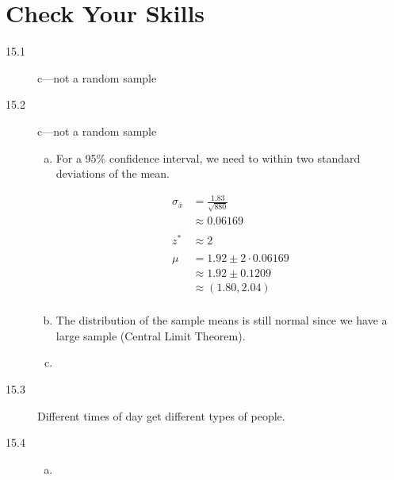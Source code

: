 \documentclass[letterpaper, landscape]{exam}
\begin{document}
  \section{Check Your Skills}
  \begin{description}
    \item[15.1] c---not a random sample

    \item[15.2] c---not a random sample
      \begin{enumerate}[(a)]
        \item 
          For a 95\% confidence interval, we need to within two standard
          deviations of the mean.

          \begin{align*}
            \sigma_{\bar{x}} & = \frac{1.83}{\sqrt{880}} \\
                             & \approx 0.06169 \\
            \\
            z^* &\approx 2 \\
            \\
            \mu & = 1.92 \pm 2 \cdot 0.06169 \\
                & \approx 1.92 \pm 0.1209 \\
                & \approx (1.80, 2.04) \\
          \end{align*}

        \item The distribution of the sample means is still normal since we have
          a large sample (Central Limit Theorem).

        \item 
      \end{enumerate}

    \item[15.3] Different times of day get different types of people.

    \item[15.4] 
      \begin{enumerate}[(a)]
        \item


\end{enumerate}
\end{description}
\end{document}
